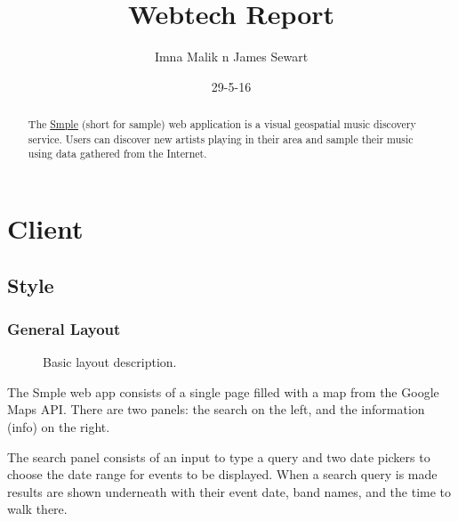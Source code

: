 \documentclass[10pt]{article}
\title{Webtech Report}
\author{Imna Malik n James Sewart}
\date{29-5-16}
\begin{document}
    \maketitle

    \tableofcontents


    \begin{abstract}
        The \href{https://smple.uk}{Smple} (short for sample) web application is a visual geospatial music discovery service. Users can discover new artists playing in their area and sample their music using data gathered from the Internet.
    \end{abstract}

    \section{Client}
        \subsection{Style}
            \subsubsection{General Layout}
                \begin{figure}[!ht]
                  \centering
                  \caption{Basic layout description.}
                \end{figure}

                The Smple web app consists of a single page filled with a map from the Google Maps API. There are two panels: the search on the left, and the information (info) on the right. 

                The search panel consists of an input to type a query and two date pickers to choose the date range for events to be displayed. When a search query is made results are shown underneath with their event date, band names, and the time to walk there.
\end{document}
